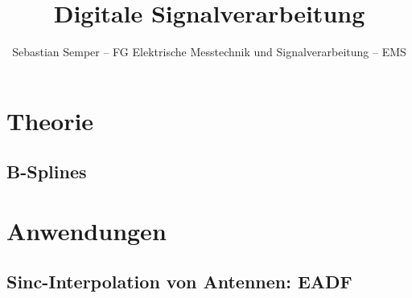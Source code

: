

\title{Digitale Signalverarbeitung}
\author{Sebastian Semper -- FG Elektrische Messtechnik und Signalverarbeitung -- EMS}




\section{Theorie}
\subsection{B-Splines}
\cite{aho1974compalgs}
\section{Anwendungen}
\subsection{Sinc-Interpolation von Antennen: EADF}


